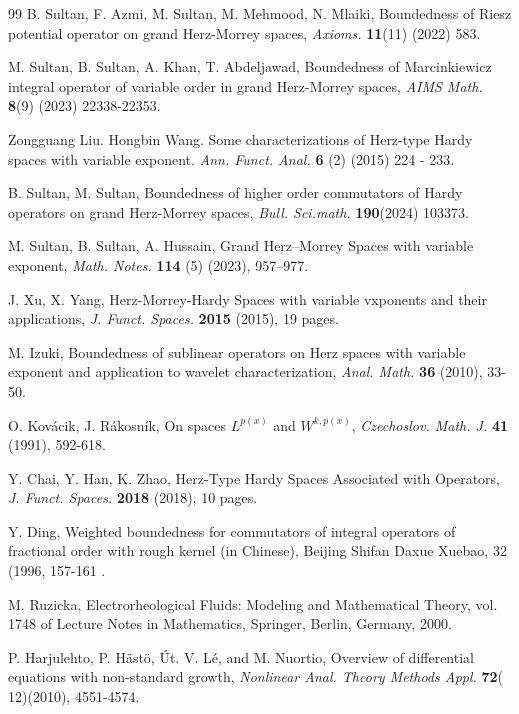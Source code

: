 \documentclass[oneside,reqno]{amsart}
\numberwithin{equation}{section}
\theoremstyle{definition}
\begin{document}
\begin{thebibliography}{99}
B. Sultan, F. Azmi, M. Sultan, M. Mehmood, N. Mlaiki, Boundedness of Riesz potential operator on grand Herz-Morrey spaces, \textit{Axioms.} {\bf 11}(11) (2022) 583.

M. Sultan, B. Sultan, A. Khan, T. Abdeljawad, Boundedness of Marcinkiewicz integral operator of variable order in grand Herz-Morrey spaces, \textit{AIMS Math.} {\bf 8}(9) (2023) 22338-22353.


Zongguang Liu. Hongbin Wang. Some characterizations of Herz-type Hardy spaces with variable exponent. \textit{Ann. Funct. Anal.} {\bf6 }(2) (2015) 224 - 233.




B. Sultan, M. Sultan, Boundedness of higher order commutators of Hardy operators on grand Herz-Morrey spaces, \textit{Bull. Sci.math.} {\bf 190}(2024) 103373.


M. Sultan, B. Sultan, A. Hussain, Grand Herz–Morrey Spaces with variable exponent, \textit{Math. Notes.}  {\bf 114} (5) (2023),  957–977.

J. Xu, X. Yang, Herz-Morrey-Hardy Spaces with variable vxponents and their applications, \textit{J. Funct. Spaces.}  {\bf 2015} (2015),  19 pages. 

M. Izuki, Boundedness of sublinear operators on Herz spaces with variable exponent and application to wavelet characterization, \textit{Anal. Math.} {\bf36} (2010), 33-50.

O. Kov\'acik, J. R\'akosn\'ik,  On spaces $L^{p(x)}$
and $W^{k,p(x)}$, \textit{Czechoslov. Math. J.} {\bf 41} (1991), 592-618.

Y. Chai, Y. Han, K. Zhao, Herz-Type Hardy Spaces Associated with Operators, \textit{J. Funct. Spaces.}  {\bf 2018} (2018), 10 pages.


Y. Ding, Weighted boundedness for commutators of integral operators of fractional order with rough kernel
(in Chinese), Beijing Shifan Daxue Xuebao, 32 (1996, 157-161 .



 M. Ruzicka, Electrorheological Fluids: Modeling and Mathematical Theory, vol. 1748 of Lecture Notes in Mathematics, Springer, Berlin, Germany, 2000.

 P. Harjulehto, P. H\"ast\"o, \'Ut. V. L\'e, and M. Nuortio, Overview of differential equations with non-standard growth, \textit{Nonlinear Anal. Theory Methods Appl.} {\bf 72}( 12)(2010),  4551-4574.


\end{thebibliography}
\end{document}
